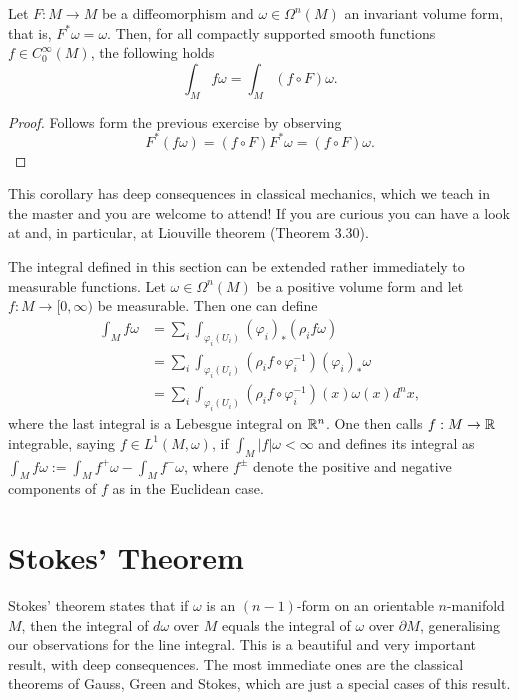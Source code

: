 \begin{corollary}
	Let $F:M\to M$ be a diffeomorphism and $\omega\in\Omega^n(M)$ an invariant volume form, that is, $F^*\omega =\omega$.
	Then, for all compactly supported smooth functions $f\in C^\infty_0(M)$, the following holds
	\begin{equation}
		\int_M f\omega = \int_M (f\circ F)\omega.
	\end{equation}
\end{corollary}
\begin{proof}
	Follows form the previous exercise by observing
	\begin{equation}
		F^*(f\omega) = (f\circ F) F^*\omega = (f\circ F)\omega.
	\end{equation}
\end{proof}

This corollary has deep consequences in classical mechanics, which we teach in the master and you are welcome to attend! If you are curious you can have a look at \cite[Chapter 3]{lectures:seri:hm} and, in particular, at Liouville theorem (Theorem 3.30).

\begin{remark}
	The integral defined in this section can be extended rather immediately to measurable functions.
	Let $\omega\in\Omega^n(M)$ be a positive volume form and let $f:M\to[0,\infty)$ be measurable.
	Then one can define
	\begin{align}
		\int_M f \omega
		 & = \sum_i \int_{\varphi_i(U_i)} (\varphi_i)_*(\rho_i f\omega)                      \\
		 & = \sum_i \int_{\varphi_i(U_i)} (\rho_i f \circ\varphi_i^{-1}) (\varphi_i)_*\omega \\
		 & = \sum_i \int_{\varphi_i(U_i)} (\rho_i f \circ\varphi_i^{-1})(x) \omega(x) d^n x,
	\end{align}
	where the last integral is a Lebesgue integral on $\mathbb{R}^n$.
	One then calls $f:M\to \mathbb{R}$ integrable, saying $f\in L^1(M,\omega)$, if $\int_M|f|\omega < \infty$ and defines its integral as $\int_M f\omega := \int_M f^+\omega - \int_M f^-\omega$, where $f^\pm$ denote the positive and negative components of $f$ as in the Euclidean case.
\end{remark}

\section{Stokes' Theorem}

Stokes' theorem states that if $\omega$ is an $(n-1)$-form on an orientable $n$-manifold $M$, then the integral of $d\omega$ over $M$ equals the integral of $\omega$ over $\partial M$, generalising our observations for the line integral.
This is a beautiful and very important result, with deep consequences. The most immediate ones are the classical theorems of Gauss, Green and Stokes, which are just a special cases of this result.

